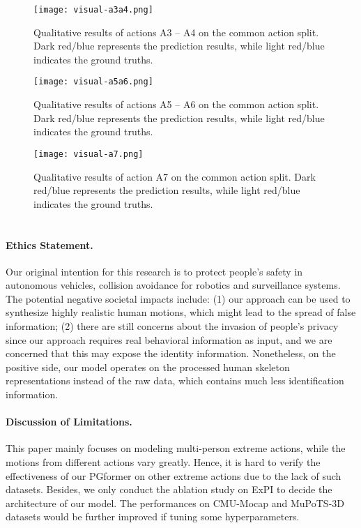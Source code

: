 \documentclass[10pt,twocolumn,letterpaper]{article}
\begin{document}
\begin{figure*}[ht]
	\begin{center}
		\centerline{\texttt{[image: visual-a3a4.png]}} \caption{Qualitative results of actions A3 -- A4 on the common action split. Dark red/blue represents the prediction results, while light red/blue indicates the ground truths. }
		\label{fig:visual_a3a4}
	\end{center}
\end{figure*}


\begin{figure*}[ht]
	\begin{center}
		\centerline{\texttt{[image: visual-a5a6.png]}} \caption{Qualitative results of actions A5 -- A6 on the common action split. Dark red/blue represents the prediction results, while light red/blue indicates the ground truths. }
		\label{fig:visual_a5a6}
	\end{center}
\end{figure*}


\begin{figure*}[ht]
	\begin{center}
		\centerline{\texttt{[image: visual-a7.png]}} \caption{Qualitative results of action A7 on the common action split. Dark red/blue represents the prediction results, while light red/blue indicates the ground truths. }
		\label{fig:visual_a7}
	\end{center}
\end{figure*}

\newpage
\section*{}
\paragraph*{Ethics Statement.}
Our original intention for this research is to protect people’s safety in autonomous vehicles, collision avoidance for robotics and surveillance systems. 
The potential negative societal impacts include: 
(1) our approach can be used to synthesize highly realistic human motions, which might lead to the spread of false information; 
(2) there are still concerns about the invasion of people’s privacy since our approach requires real behavioral information as input, and we are concerned that this may expose the identity information. 
Nonetheless, on the positive side, our model operates on the processed human skeleton representations instead of the raw data, which contains much less identification information. 


\paragraph*{Discussion of Limitations.} 
This paper mainly focuses on modeling multi-person extreme actions, while the motions from different actions vary greatly. 
Hence, it is hard to verify the effectiveness of our PGformer on other extreme actions due to the lack of such datasets. 
Besides, we only conduct the ablation study on ExPI to decide the architecture of our model. 
The performances on CMU-Mocap and MuPoTS-3D datasets would be further improved if tuning some hyperparameters.
\end{document}

